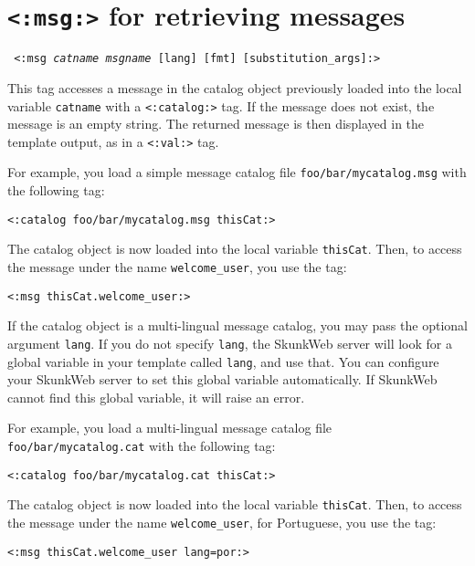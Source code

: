 \documentclass{manual}
\begin{document}
\section{\texttt{<:msg:>} for retrieving messages}
\label{tagmsg}

\texttt{
<:msg \emph{catname msgname} [lang] 
    [fmt] [substitution_args]:>
}

This tag accesses a message in the catalog object
previously loaded into the local variable \texttt{catname}
with a \texttt{<:catalog:>}
tag. If the message does not
exist, the message is an empty string. The returned message
is then displayed in the template output, as in a
\texttt{<:val:>}  tag.

For example, you load a simple message catalog file
\texttt{foo/bar/mycatalog.msg} with the following tag:

\begin{verbatim}
<:catalog foo/bar/mycatalog.msg thisCat:>
\end{verbatim}

The catalog object is now loaded into the local variable
\texttt{thisCat}. Then, to access the message under the name
\texttt{welcome_user}, you use the tag:

\begin{verbatim}
<:msg thisCat.welcome_user:>
\end{verbatim}

If the catalog object is a multi-lingual message catalog,
you may pass the optional argument \texttt{lang}.
If you do not specify \texttt{lang},
the SkunkWeb server will look for a global variable in your template
called \texttt{lang}, and use that.  You can configure your SkunkWeb
server to set this global variable automatically.  If SkunkWeb cannot
find this global variable, it will raise an error.

For example, you load a multi-lingual message catalog file
\texttt{foo/bar/mycatalog.cat} with the following tag:

\begin{verbatim}
<:catalog foo/bar/mycatalog.cat thisCat:>
\end{verbatim}


The catalog object is now loaded into the local variable
\texttt{thisCat}. Then, to access the message under the name
\texttt{welcome_user}, for Portuguese, you use the tag:

\begin{verbatim}
<:msg thisCat.welcome_user lang=por:>
\end{verbatim}
\end{document}
